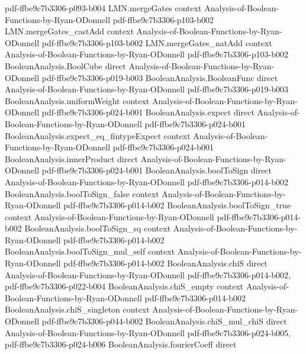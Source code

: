 \begin{theorem}
  {pdf-ffbe9c7b3306-p093-b004}
\proofstep
  {LMN.mergeGates}
  {context}
  {Analysis-of-Boolean-Functions-by-Ryan-ODonnell}
  {pdf-ffbe9c7b3306-p103-b002}
\proofstep
  {LMN.mergeGates_castAdd}
  {context}
  {Analysis-of-Boolean-Functions-by-Ryan-ODonnell}
  {pdf-ffbe9c7b3306-p103-b002}
\proofstep
  {LMN.mergeGates_natAdd}
  {context}
  {Analysis-of-Boolean-Functions-by-Ryan-ODonnell}
  {pdf-ffbe9c7b3306-p103-b002}
\proofstep
  {BooleanAnalysis.BoolCube}
  {direct}
  {Analysis-of-Boolean-Functions-by-Ryan-ODonnell}
  {pdf-ffbe9c7b3306-p019-b003}
\proofstep
  {BooleanAnalysis.BooleanFunc}
  {direct}
  {Analysis-of-Boolean-Functions-by-Ryan-ODonnell}
  {pdf-ffbe9c7b3306-p019-b003}
\proofstep
  {BooleanAnalysis.uniformWeight}
  {context}
  {Analysis-of-Boolean-Functions-by-Ryan-ODonnell}
  {pdf-ffbe9c7b3306-p024-b001}
\proofstep
  {BooleanAnalysis.expect}
  {direct}
  {Analysis-of-Boolean-Functions-by-Ryan-ODonnell}
  {pdf-ffbe9c7b3306-p024-b001}
\proofstep
  {BooleanAnalysis.expect_eq_fintypeExpect}
  {context}
  {Analysis-of-Boolean-Functions-by-Ryan-ODonnell}
  {pdf-ffbe9c7b3306-p024-b001}
\proofstep
  {BooleanAnalysis.innerProduct}
  {direct}
  {Analysis-of-Boolean-Functions-by-Ryan-ODonnell}
  {pdf-ffbe9c7b3306-p024-b001}
\proofstep
  {BooleanAnalysis.boolToSign}
  {direct}
  {Analysis-of-Boolean-Functions-by-Ryan-ODonnell}
  {pdf-ffbe9c7b3306-p014-b002}
\proofstep
  {BooleanAnalysis.boolToSign_false}
  {context}
  {Analysis-of-Boolean-Functions-by-Ryan-ODonnell}
  {pdf-ffbe9c7b3306-p014-b002}
\proofstep
  {BooleanAnalysis.boolToSign_true}
  {context}
  {Analysis-of-Boolean-Functions-by-Ryan-ODonnell}
  {pdf-ffbe9c7b3306-p014-b002}
\proofstep
  {BooleanAnalysis.boolToSign_sq}
  {context}
  {Analysis-of-Boolean-Functions-by-Ryan-ODonnell}
  {pdf-ffbe9c7b3306-p014-b002}
\proofstep
  {BooleanAnalysis.boolToSign_mul_self}
  {context}
  {Analysis-of-Boolean-Functions-by-Ryan-ODonnell}
  {pdf-ffbe9c7b3306-p014-b002}
\proofstep
  {BooleanAnalysis.chiS}
  {direct}
  {Analysis-of-Boolean-Functions-by-Ryan-ODonnell}
  {pdf-ffbe9c7b3306-p014-b002,
    pdf-ffbe9c7b3306-p022-b004}
\proofstep
  {BooleanAnalysis.chiS_empty}
  {context}
  {Analysis-of-Boolean-Functions-by-Ryan-ODonnell}
  {pdf-ffbe9c7b3306-p014-b002}
\proofstep
  {BooleanAnalysis.chiS_singleton}
  {context}
  {Analysis-of-Boolean-Functions-by-Ryan-ODonnell}
  {pdf-ffbe9c7b3306-p044-b002}
\proofstep
  {BooleanAnalysis.chiS_mul_chiS}
  {direct}
  {Analysis-of-Boolean-Functions-by-Ryan-ODonnell}
  {pdf-ffbe9c7b3306-p024-b005,
    pdf-ffbe9c7b3306-p024-b006}
\proofstep
  {BooleanAnalysis.fourierCoeff}
  {direct}

\end{theorem}
